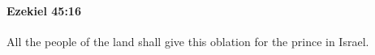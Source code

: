 
		\paragraph{Ezekiel 45:16} %
			\label{EZEKIEL-45-16}

			All the people of the land shall give this oblation for the prince in Israel.


